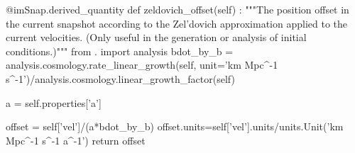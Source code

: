 @imSnap.derived_quantity
def zeldovich_offset(self) :
    """The position offset in the current snapshot according to
    the Zel'dovich approximation applied to the current velocities.
    (Only useful in the generation or analysis of initial conditions.)"""
    from . import analysis
    bdot_by_b = analysis.cosmology.rate_linear_growth(self, unit='km Mpc^-1
s^-1')/analysis.cosmology.linear_growth_factor(self)

    a = self.properties['a']

    offset = self['vel']/(a*bdot_by_b)
    offset.units=self['vel'].units/units.Unit('km Mpc^-1 s^-1 a^-1')
    return offset



\inx
\fin
\con
